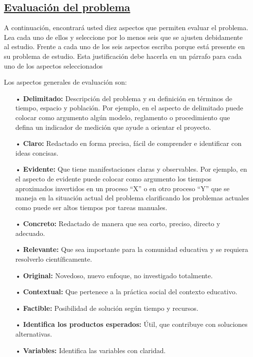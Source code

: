 \documentclass[12pt, a4paper, nofontenc, numbers=endperiod]{apa7}
\begin{document}
{		\subsection*{\normalsize \centering \underline{Evaluación del problema}}
		\setlength{\parindent}{1.27cm}A continuación, encontrará usted diez aspectos que permiten evaluar el problema. Lea cada uno de ellos y seleccione por lo menos seis que se ajusten debidamente al estudio. Frente a cada uno de los seis aspectos escriba porque está presente en su problema de estudio. Esta justificación debe hacerla en un párrafo para cada uno de los aspectos seleccionados 
		
		\setlength{\parindent}{1.27cm}Los aspectos generales de evaluación son:
{\doublespacing
	\begin{itemize}[leftmargin=1.70cm]
		\item[•] \textbf{Delimitado:} Descripción del problema y su definición en términos de tiempo, espacio y población. Por ejemplo, en el aspecto de delimitado puede colocar como argumento algún modelo, reglamento o procedimiento que defina un indicador de medición que ayude a orientar el proyecto.
		\item[•] \textbf{Claro:} Redactado en forma precisa, fácil de comprender e identificar con ideas concisas.
		\item[•] \textbf{Evidente:} Que tiene manifestaciones claras y observables. Por ejemplo, en el aspecto de evidente puede colocar como argumento los tiempos aproximados invertidos en un proceso “X” o en otro proceso “Y” que se maneja en la situación actual del problema clarificando los problemas actuales como puede ser altos tiempos por tareas manuales.
		\item[•] \textbf{Concreto:} Redactado de manera que sea corto, preciso, directo y adecuado.
		\item[•] \textbf{Relevante:} Que sea importante para la comunidad educativa y se requiera resolverlo científicamente.
		\item[•] \textbf{Original:} Novedoso, nuevo enfoque, no investigado totalmente.
		\item[•] \textbf{Contextual:} Que pertenece a la práctica social del contexto educativo.
		\item[•] \textbf{Factible:} Posibilidad de solución según tiempo y recursos.
		\item[•] \textbf{Identifica los productos esperados:} Útil, que contribuye con soluciones alternativas.
		\item[•] \textbf{Variables:} Identifica las variables con claridad.
	\end{itemize}
}
}
\end{document}

